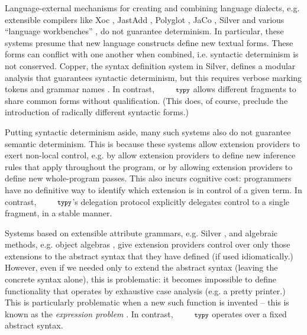 \documentclass[10pt]{sigplanconf}
\newcommand{\typy}{\texttt{\footnotesize typy}}
\begin{document}



Language-external mechanisms for creating and combining language dialects, e.g. extensible compilers like Xoc \cite{conf/asplos/CoxBCKK08}, JastAdd \cite{Ekman:2007:JEJ:1297027.1297029}, Polyglot \cite{Nystrom-Clarkson-Myers03}, JaCo \cite{zenger2001implementing}, Silver \cite{VanWyk:2010:SEA} and various ``language workbenches'' \cite{erdweg2013state}, do not guarantee determinism. In particular, these systems presume that new language constructs define new textual forms. These forms can conflict with one another when combined, i.e. syntactic determinism is not conserved. Copper, the syntax definition system in Silver, defines a modular analysis that guarantees syntactic determinism, but this requires verbose marking tokens and grammar names \cite{conf/pldi/SchwerdfegerW09}. In contrast, $\typy$ allows  different fragments to share common forms without qualification. (This does, of course, preclude the introduction of radically different syntactic forms.)

Putting syntactic determinism aside, many such systems also do not guarantee semantic determinism. This is because these systems allow extension providers to exert non-local control, e.g. by allow extension providers to define new inference rules that apply throughout the program, or by allowing extension providers to define new whole-program passes. This also incurs cognitive cost: programmers have no definitive way to identify which extension is in control of a given term. In contrast, $\typy$'s delegation protocol explicitly delegates control to a single fragment, in a stable manner.

Systems based on extensible attribute grammars, e.g. Silver \cite{VanWyk:2010:SEA}, and algebraic methods, e.g. object algebras \cite{oliveira2012extensibility}, give extension providers control over only those extensions to the abstract syntax that they have defined (if used idiomatically.) However, even if we needed only to extend the abstract syntax (leaving the concrete syntax alone), this is problematic: it becomes impossible to define functionality that operates by exhaustive case analysis (e.g. a pretty printer.) This is particularly problematic when a new such function is invented -- this is known as the \emph{expression problem} \cite{wadler1998expression,Reynolds75}. In contrast, $\typy$ operates over a fixed abstract syntax.
\end{document}
